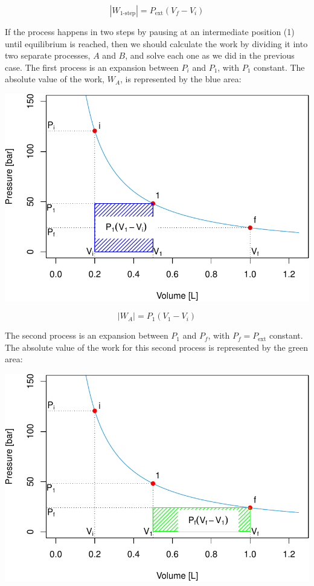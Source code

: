 \documentclass[
  9pt,
]{extbook}
\theoremstyle{definition}
\theoremstyle{definition}
\theoremstyle{definition}
\theoremstyle{remark}
\begin{document}
\begin{equation}
\left| W_{\text{1-step}} \right| = P_{\text{ext}} (V_f-V_i)
  \label{eq:Warea1}
\end{equation}

If the process happens in two steps by pausing at an intermediate position (1) until equilibrium is reached, then we should calculate the work by dividing it into two separate processes, \(A\) and \(B\), and solve each one as we did in the previous case. The first process is an expansion between \(P_i\) and \(P_1\), with \(P_1\) constant. The absolute value of the work, \(W_A\), is represented by the blue area:

\begin{center}\includegraphics[width=0.7\linewidth]{pchem1_files/figure-latex/unnamed-chunk-4-1} \end{center}

\begin{equation}
\left| W_A \right| = P_1 (V_1-V_i)
  \label{eq:Warea2}
\end{equation}

The second process is an expansion between \(P_1\) and \(P_f\), with \(P_f=P_{\text{ext}}\) constant. The absolute value of the work for this second process is represented by the green area:

\begin{center}\includegraphics[width=0.7\linewidth]{pchem1_files/figure-latex/unnamed-chunk-5-1} \end{center}
\end{document}
